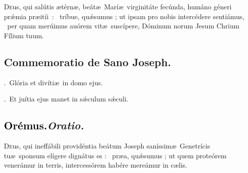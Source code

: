 \documentclass[12pt]{article} %
\newenvironment{response}{\leftskip 0in \setlength{\parindent}{0in}}{\vspace{1 mm}}
\let\oldgresixstar\gresixstar
\renewcommand{\gresixstar}{\textcolor{benred8}{\oldgresixstar}}
\let\oldgredagger\gredagger
\renewcommand{\gredagger}{\textcolor{benred8}{\oldgredagger}}
\let\oldVbar\Vbar
\renewcommand{\Vbar}{\textcolor{benred8}{\oldVbar .}}
\let\oldRbar\Rbar
\renewcommand{\Rbar}{\textcolor{benred8}{\oldRbar .}}
\def\capitulumSpace{\hspace{20 mm}}
\begin{document}
\begin{response}\lettrine{D}{e}us, qui sal\'{u}tis \ae t\'{e}rn\ae , be\'{a}t\ae\ Mar\'{i}\ae\ virginit\'{a}te fec\'{u}nda, hum\'{a}no g\'{e}neri pr\'{\ae}mia \mbox{pr\ae{}it\'{i}i : \gredagger} tr\'{i}bue, qu\'{\ae}sumus ; ut ipsam pro nobis interc\'{e}dere senti\'{a}mus, \gresixstar\ per quam mer\'{u}imus au\'{o}rem vit\ae\ susc\'{i}pere, D\'{o}minum norum Jesum Chrium F\'{i}lium tuum.

\end{response}


\subsection*{Commemoratio de Sano Joseph.}


\gresetfirstlineaboveinitial{\small \textsc{ \textbf{\textcolor{benred8}{VIII}}}}{\small \textsc{ \textbf{\textcolor{benred8}{VIII}}}}

\begin{response}
\Vbar\ Gl\'{o}ria et div\'{i}ti\ae\ in domo ejus.

\Rbar\ Et ju\'{i}tia ejus manet in s\'{\ae}culum s\'{\ae}culi.

\end{response}

\subsection*{\textcolor{black}{Or\'{e}mus.}\capitulumSpace \emph{Oratio.}}

\begin{response}\lettrine{D}{e}us, qui ineff\'{a}bili provid\'{e}ntia be\'{a}tum Joseph san\'{i}ssim\ae\ Genetr\'{i}cis tu\ae\ sponsum el\'{i}gere dign\'{a}tus es : \gresixstar\ pr\ae {}a, qu\'{\ae}sumus ; ut quem prote\'{o}rem vener\'{a}mur in terris, intercess\'{o}rem hab\'{e}re mere\'{a}mur in c\ae lis.

\end{response}

\end{document}
